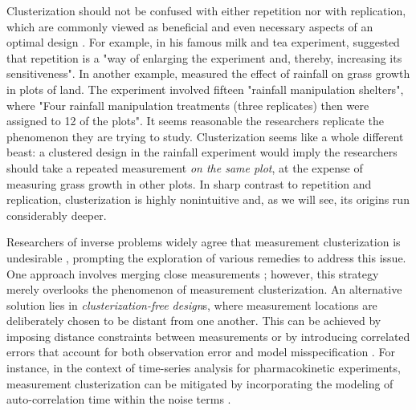 Clusterization should not be confused with either repetition nor with
replication, which are commonly viewed as beneficial and even
necessary aspects of an optimal design \cite{morris, fisher
  schafer2001replication}. For example, in his famous milk and tea
experiment, \cite[Section 11]{fisher} suggested that repetition is a
"way of enlarging the experiment and, thereby, increasing its
sensitiveness". In another example, \cite{fay2000rainfall} measured
the effect of rainfall on grass growth in plots of land. The
experiment involved fifteen "rainfall manipulation shelters", where
"Four rainfall manipulation treatments (three replicates) then were
assigned to 12 of the plots". It seems reasonable the researchers
replicate the phenomenon they are trying to study. Clusterization
seems like a whole different beast: a clustered design in the rainfall
experiment would imply the researchers should take a repeated
measurement \emph{on the same plot}, at the expense of measuring grass
growth in other plots. In sharp contrast to repetition and
replication, clusterization is highly nonintuitive and, as we will
see, its origins run considerably deeper.


Researchers of inverse problems widely agree that measurement
clusterization is undesirable \cite{fedorov1996, nyberg2012,
  fedorov1997, Ucinski05, neitzel2019sparse}, prompting the
exploration of various remedies to address this issue. One approach
involves merging close measurements \cite{fedorov1997}; however, this
strategy merely overlooks the phenomenon of measurement
clusterization. An alternative solution lies in
\emph{clusterization-free design}s, where measurement locations are
deliberately chosen to be distant from one another. This can be
achieved by imposing distance constraints between measurements or by
introducing correlated errors that account for both observation error
and model misspecification \cite{Ucinski05}. For instance, in the
context of time-series analysis for pharmacokinetic experiments,
measurement clusterization can be mitigated by incorporating the
modeling of auto-correlation time within the noise terms
\cite{nyberg2012}.


